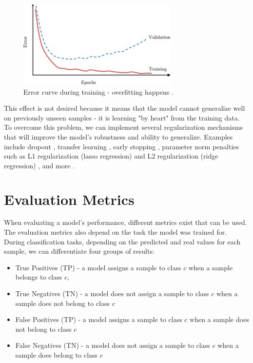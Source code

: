 \begin{figure}[H]
\begin{centering}
\includegraphics[width=8cm]{assets/images/overfitting.jpg}
\par\end{centering}
\caption{Error curve during training - overfitting happens \cite{Santosh2022-2}.}
\label{fig:overfitting}
\end{figure}

This effect is not desired because it means that the model cannot generalize well on previously unseen samples - it is learning "by heart" from the training data. To overcome this problem, we can implement several regularization mechanisms that will improve the model's robustness and ability to generalize. Examples include dropout \cite{Srivastava2014}, transfer learning \cite{Pan2009}, early stopping \cite{Sarle1996}, parameter norm penalties such as L1 regularization (lasso regression) and L2 regularization (ridge regression) \cite{Krogh1991}, and more \cite{Santosh2022-2}.



\section{Evaluation Metrics}
\label{chapter:dnn:eval}

When evaluating a model's performance, different metrics exist that can be used. The evaluation metrics also depend on the task the model was trained for. During classification tasks, depending on the predicted and real values for each sample, we can differentiate four groups of results:

\begin{itemize}
    \item True Positives (TP) - a model assigns a sample to class $c$ when a sample belongs to class $c$,
    \item True Negatives (TN) - a model does not assign a sample to class $c$ when a sample does not belong to class $c$
    \item False Positives (TP) - a model assigns a sample to class $c$ when a sample does not belong to class $c$
    \item False Negatives (TN) - a model does not assign a sample to class $c$ when a sample does belong to class $c$
\end{itemize}

